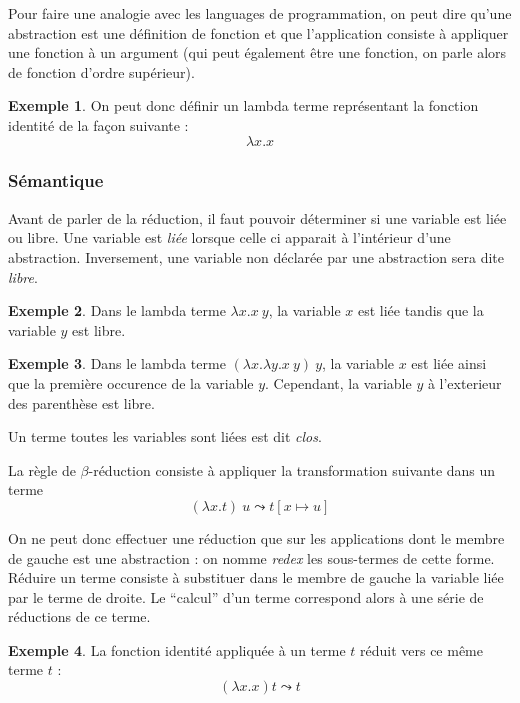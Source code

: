 \documentclass{article}
\theoremstyle{definition}
\newtheorem{example}{Exemple}
\theoremstyle{remark}
\begin{document}
Pour faire une analogie avec les languages de programmation, on peut
dire qu'une abstraction est une définition de fonction et que
l'application consiste à appliquer une fonction à un argument (qui
peut également être une fonction, on parle alors de fonction d'ordre
supérieur).

\begin{example}
 On peut donc définir un lambda terme représentant la fonction identité
 de la façon suivante :
%
\[ 
  \lambda x. x
\]
\end{example}

\subsubsection{Sémantique}

Avant de parler de la réduction, il faut pouvoir déterminer si une
variable est liée ou libre. Une variable est \emph{liée} lorsque celle
ci apparait à l'intérieur d'une abstraction. Inversement, une variable
non déclarée par une abstraction sera dite \emph{libre}.

\begin{example}

 Dans le lambda terme \(\lambda x. x\: y\), la variable \(x\) est liée
 tandis que la variable \(y\) est libre.
\end{example}

\begin{example}
  Dans le lambda terme \((\lambda x. \lambda y. x\: y)\: y\), la
  variable \(x\) est liée ainsi que la première occurence de la
  variable \(y\). Cependant, la variable \(y\) à l'exterieur des
  parenthèse est libre.
\end{example}

Un terme toutes les variables sont liées est dit \emph{clos}.

La règle de \(\beta\)-réduction consiste à appliquer la transformation
suivante dans un terme
%
\[
(\lambda x. t)\: u \leadsto t[x \mapsto u]
\]

On ne peut donc effectuer une réduction que sur les applications dont
le membre de gauche est une abstraction : on nomme \emph{redex} les
sous-termes de cette forme. Réduire un terme consiste à substituer
dans le membre de gauche la variable liée par le terme de droite.  Le
``calcul'' d'un terme correspond alors à une série de réductions de ce
terme.


\begin{example}

  La fonction identité appliquée à un terme \(t\) réduit vers ce même
  terme \(t\) :
  \[
  (\lambda x. x) t \leadsto t
  \]
\end{example}
\end{document}
